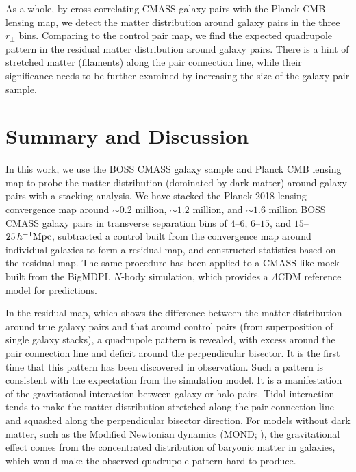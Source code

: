 \documentclass[twocolumn,anonymous,linenumbers]{aastex701}
\newcommand{\hinvMpc}{h^{-1}{\rm Mpc}}
\begin{document}
\medskip
\medskip

As a whole, by cross-correlating CMASS galaxy pairs with the Planck CMB lensing map, we detect the matter distribution around galaxy pairs in the three $r_{\perp}$ bins. Comparing to the control pair map, we find the expected quadrupole pattern in the residual matter distribution around galaxy pairs. There is a hint of stretched matter (filaments) along the pair connection line, while their significance needs to be further examined by increasing the size of the galaxy pair sample.

\section{Summary and Discussion}
\label{sec:discussion}

In this work, we use the BOSS CMASS galaxy sample and Planck CMB lensing map to probe the matter distribution (dominated by dark matter) around galaxy pairs with a stacking analysis. We have stacked the Planck 2018 lensing convergence map around $\sim 0.2$ million, $\sim 1.2$ million, and $\sim 1.6$ million BOSS CMASS galaxy pairs in transverse separation bins of $4$--$6$, $6$--$15$, and $15$--$25\,\hinvMpc$,
subtracted a control built from the convergence map around individual galaxies to form a residual map, and constructed statistics based on the residual map.
The same procedure has been applied to a
CMASS-like mock built from the BigMDPL $N$-body simulation, which provides a $\Lambda$CDM reference model for predictions. 

In the residual map, which shows the difference between the matter distribution around true galaxy pairs and that around control pairs (from superposition of single galaxy stacks), a quadrupole pattern is revealed, with excess around the pair connection line and deficit around the perpendicular bisector. It is the first time that this pattern has been discovered in observation. Such a pattern is consistent with the expectation from the simulation model. It is a manifestation of the gravitational interaction between galaxy or halo pairs. Tidal interaction tends to make the matter distribution stretched along the pair connection line and squashed along the perpendicular bisector direction. For models without dark matter, such as the Modified Newtonian dynamics (MOND; \citealt{Milgrom1983}), the gravitational effect comes from the concentrated distribution of baryonic matter in galaxies, which would make the observed quadrupole pattern hard to produce. 
\end{document}

